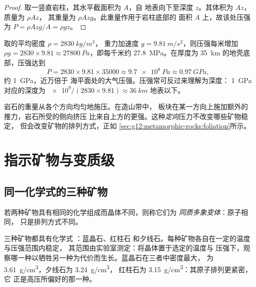 \begin{proof}
取一竖直岩柱，其水平截面积为 $A$，自
地表向下至深度 $z$。其体积为 $Az$，质量为 $\rho A z$，
其重量为 $\rho A z g$。此重量作用于岩柱底部的
面积 $A$ 上，故该处压强为 $P = \rho A z g / A = \rho g z$。
\end{proof}

取的平均密度 $\rho = \qty{2830}{kg/m^3}$，
重力加速度 $g = \qty{9.81}{m/s^2}$，则压强每米增加 $\rho g = 2830 \times 9.81
\approx \qty{27800}{Pa}$，即每千米约
\qty{27.8}{MPa}。在厚度为 \qty{35}{km} 的地壳底部，压强达到
\[
  P = 2830 \times 9.81 \times \num{35000} \approx \qty{9.7e8}{Pa} \approx
  \qty{0.97}{GPa},
\]
约 \qty{1}{GPa}，近万倍于
海平面处的大气压强。压强常可反过来理解为深度：
\qty{1}{GPa} 对应的深度为 $\num{e9}/(2830 \times 9.81) \approx \qty{36}{km}$
地表以下。

岩石的重量从各个方向均匀地施压。在造山带中，
板块在某一方向上施加额外的推力，岩石所受的侧向挤压
比来自上方的更强。这种\emph{定向}压力不改变哪些矿物稳定，
但会改变矿物的排列方式，正如
\cref{sec:g12:metamorphic-rocks:foliation}所示。

\section{指示矿物与变质级}

\subsection{同一化学式的三种矿物}

\begin{definition}[同质多象变体]\label{def:g12:metamorphic-rocks:polymorph}
若两种矿物具有相同的化学组成而晶体不同，则称它们为
\emph{同质多象变体}：原子相同，
只是排列方式不同。
\end{definition}

三种矿物都具有化学式 ：蓝晶石、红柱石
和夕线石。每种矿物各自在一定的温度与压强范围内稳定，
其范围由实验室测定：将晶体置于选定的温度与
压强下，观察哪一种以牺牲另一种为代价而生长。蓝晶石在三者中密度最大，
为 \qty{3.61}{g/cm^3}，夕线石为 \qty{3.24}{g/cm^3}，
红柱石为 \qty{3.15}{g/cm^3}：其原子排列更紧密，它
正是高压所偏好的那一种。

